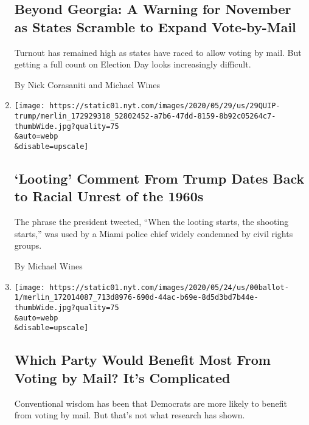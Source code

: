 \begin{enumerate}
  \hypertarget{beyond-georgia-a-warning-for-november-as-states-scramble-to-expand-vote-by-mail}{%
  \subsection{Beyond Georgia: A Warning for November as States Scramble
  to Expand
  Vote-by-Mail}\label{beyond-georgia-a-warning-for-november-as-states-scramble-to-expand-vote-by-mail}}

  Turnout has remained high as states have raced to allow voting by
  mail. But getting a full count on Election Day looks increasingly
  difficult.

  By Nick Corasaniti and Michael Wines
\item
  \href{/2020/05/29/us/looting-starts-shooting-starts.html}{}

  \texttt{[image: https://static01.nyt.com/images/2020/05/29/us/29QUIP-trump/merlin\_172929318\_52802452-a7b6-47dd-8159-8b92c05264c7-thumbWide.jpg?quality=75\\\&auto=webp\\\&disable=upscale]}

  \hypertarget{looting-comment-from-trump-dates-back-to-racial-unrest-of-the-1960s}{%
  \subsection{`Looting' Comment From Trump Dates Back to Racial Unrest
  of the
  1960s}\label{looting-comment-from-trump-dates-back-to-racial-unrest-of-the-1960s}}

  The phrase the president tweeted, ``When the looting starts, the
  shooting starts,'' was used by a Miami police chief widely condemned
  by civil rights groups.

  By Michael Wines
\item
  \href{/2020/05/25/us/vote-by-mail-coronavirus.html}{}

  \texttt{[image: https://static01.nyt.com/images/2020/05/24/us/00ballot-1/merlin\_172014087\_713d8976-690d-44ac-b69e-8d5d3bd7b44e-thumbWide.jpg?quality=75\\\&auto=webp\\\&disable=upscale]}

  \hypertarget{which-party-would-benefit-most-from-voting-by-mail-its-complicated}{%
  \subsection{Which Party Would Benefit Most From Voting by Mail? It's
  Complicated}\label{which-party-would-benefit-most-from-voting-by-mail-its-complicated}}

  Conventional wisdom has been that Democrats are more likely to benefit
  from voting by mail. But that's not what research has shown.


\end{enumerate}
